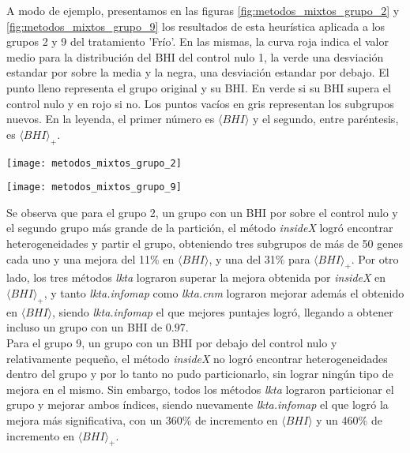 A modo de ejemplo, presentamos en las figuras \ref{fig:metodos_mixtos_grupo_2} y \ref{fig:metodos_mixtos_grupo_9} los resultados de esta heurística aplicada a los grupos 2 y 9 del tratamiento 'Frío'. En las mismas, la curva roja indica el valor medio para la distribución del BHI del control nulo 1, la verde una desviación estandar por sobre la media y la negra, una desviación estandar por debajo. El punto lleno representa el grupo original y su BHI. En verde si su BHI supera el control nulo y en rojo si no. Los puntos vacíos en gris representan los subgrupos nuevos. En la leyenda, el primer número es $\langle BHI \rangle$ y el segundo, entre paréntesis, es $\langle BHI \rangle _{+}$.\\
\begin{center}
\texttt{[image: metodos\_mixtos\_grupo\_2]}
\label{fig:metodos_mixtos_grupo_2}
\end{center}
\begin{center}
\texttt{[image: metodos\_mixtos\_grupo\_9]}
\label{fig:metodos_mixtos_grupo_9}
\end{center}
Se observa que para el grupo 2, un grupo con un BHI por sobre el control nulo y el segundo grupo más grande de la partición, el método \textit{insideX} logró encontrar heterogeneidades y partir el grupo, obteniendo tres subgrupos de más de 50 genes cada uno y una mejora del 11\% en $\langle BHI \rangle$, y una del 31\% para $\langle BHI \rangle _{+}$. Por otro lado, los tres métodos \textit{lkta} lograron superar la mejora obtenida por \textit{insideX} en $\langle BHI \rangle _{+}$, y tanto \textit{lkta.infomap} como \textit{lkta.cnm} lograron mejorar además el obtenido en $\langle BHI \rangle$, siendo \textit{lkta.infomap} el que mejores puntajes logró, llegando a obtener incluso un grupo con un BHI de $0.97$.\\
Para el grupo 9, un grupo con un BHI por debajo del control nulo y relativamente pequeño, el método \textit{insideX} no logró encontrar heterogeneidades dentro del grupo y por lo tanto no pudo particionarlo, sin lograr ningún tipo de mejora en el mismo. Sin embargo, todos los métodos \textit{lkta} lograron particionar el grupo y mejorar ambos índices, siendo nuevamente \textit{lkta.infomap} el que logró la mejora más significativa, con un 360\% de incremento en $\langle BHI \rangle$ y un 460\% de incremento en $\langle BHI \rangle _{+}$.\\
